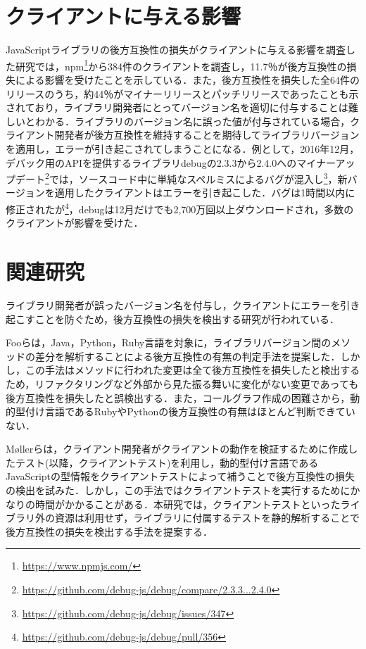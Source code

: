 \documentclass[11pt,dvipdfmx]{jreport}
\begin{document}
\section{クライアントに与える影響}
JavaScriptライブラリの後方互換性の損失がクライアントに与える影響を調査した研究\cite{impact-analysis-for-clients}では，npm\footnote{\url{https://www.npmjs.com/}}から384件のクライアントを調査し，11.7％が後方互換性の損失による影響を受けたことを示している．また，後方互換性を損失した全64件のリリースのうち，約44％がマイナーリリースとパッチリリースであったことも示されており，ライブラリ開発者にとってバージョン名を適切に付与することは難しいとわかる．ライブラリのバージョン名に誤った値が付与されている場合，クライアント開発者が後方互換性を維持することを期待してライブラリバージョンを適用し，エラーが引き起こされてしまうことになる．例として，2016年12月，デバック用のAPIを提供するライブラリdebugの2.3.3から2.4.0へのマイナーアップデート\footnote{\url{https://github.com/debug-js/debug/compare/2.3.3...2.4.0}}では，ソースコード中に単純なスペルミスによるバグが混入し\footnote{\url{https://github.com/debug-js/debug/issues/347}}，新バージョンを適用したクライアントはエラーを引き起こした．バグは1時間以内に修正されたが\footnote{\url{https://github.com/debug-js/debug/pull/356}}，debugは12月だけでも2,700万回以上ダウンロードされ，多数のクライアントが影響を受けた．

\section{関連研究}
ライブラリ開発者が誤ったバージョン名を付与し，クライアントにエラーを引き起こすことを防ぐため，後方互換性の損失を検出する研究が行われている．

Fooらは，Java，Python，Ruby言語を対象に，ライブラリバージョン間のメソッドの差分を解析することによる後方互換性の有無の判定手法を提案した\cite{foo}．しかし，この手法はメソッドに行われた変更は全て後方互換性を損失したと検出するため，リファクタリングなど外部から見た振る舞いに変化がない変更であっても後方互換性を損失したと誤検出する．また，コールグラフ作成の困難さから，動的型付け言語であるRubyやPythonの後方互換性の有無はほとんど判断できていない．

Møllerらは，クライアント開発者がクライアントの動作を検証するために作成したテスト(以降，クライアントテスト)を利用し，動的型付け言語であるJavaScriptの型情報をクライアントテストによって補うことで後方互換性の損失の検出を試みた\cite{type-regression-testing}\cite{model-based-testing}．しかし，この手法ではクライアントテストを実行するためにかなりの時間がかかることがある．本研究では，クライアントテストといったライブラリ外の資源は利用せず，ライブラリに付属するテストを静的解析することで後方互換性の損失を検出する手法を提案する．
\end{document}
